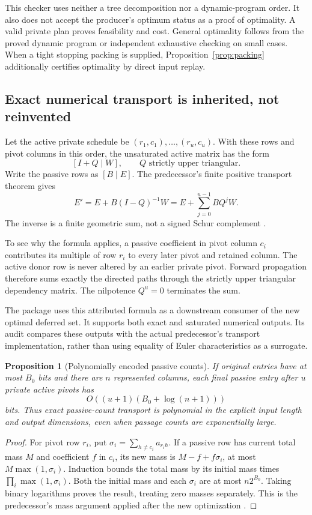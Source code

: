 \documentclass[11pt]{article}
\newtheorem{proposition}[theorem]{Proposition}
\theoremstyle{definition}\newtheorem{definition}[theorem]{Definition}
\theoremstyle{remark}\newtheorem{remark}[theorem]{Remark}
\begin{document}
This checker uses neither a tree decomposition nor a dynamic-program order. It also does not accept the producer's optimum status as a proof of optimality. A valid private plan proves feasibility and cost. General optimality follows from the proved dynamic program or independent exhaustive checking on small cases. When a tight stopping packing is supplied, Proposition~\ref{prop:packing} additionally certifies optimality by direct input replay.

\subsection{Exact numerical transport is inherited, not reinvented}
Let the active private schedule be $(r_1,c_1),\ldots,(r_u,c_u)$. With these rows and pivot columns in this order, the unsaturated active matrix has the form
\[
 [I+Q\mid W],\qquad Q\text{ strictly upper triangular}.
\]
Write the passive rows as $[B\mid E]$. The predecessor's finite positive transport theorem gives
\begin{equation}
 E'=E+B(I-Q)^{-1}W
   =E+\sum_{j=0}^{u-1}BQ^jW.
 \label{eq:passive}
\end{equation}
The inverse is a finite geometric sum, not a signed Schur complement \cite{positive}.

To see why the formula applies, a passive coefficient in pivot column $c_i$ contributes its multiple of row $r_i$ to every later pivot and retained column. The active donor row is never altered by an earlier private pivot. Forward propagation therefore sums exactly the directed paths through the strictly upper triangular dependency matrix. The nilpotence $Q^u=0$ terminates the sum.

The package uses this attributed formula as a downstream consumer of the new optimal deferred set. It supports both exact and saturated numerical outputs. Its audit compares these outputs with the actual predecessor's transport implementation, rather than using equality of Euler characteristics as a surrogate.

\begin{proposition}[Polynomially encoded passive counts]
If original entries have at most $B_0$ bits and there are $n$ represented columns, each final passive entry after $u$ private active pivots has
\[
 O((u+1)(B_0+\log(n+1)))
\]
bits. Thus exact passive-count transport is polynomial in the explicit input length and output dimensions, even when passage counts are exponentially large.
\end{proposition}
\begin{proof}
For pivot row $r_i$, put $\sigma_i=\sum_{h\ne c_i}a_{r_i h}$. If a passive row has current total mass $M$ and coefficient $f$ in $c_i$, its new mass is $M-f+f\sigma_i$, at most $M\max(1,\sigma_i)$. Induction bounds the total mass by its initial mass times $\prod_i\max(1,\sigma_i)$. Both the initial mass and each $\sigma_i$ are at most $n2^{B_0}$. Taking binary logarithms proves the result, treating zero masses separately. This is the predecessor's mass argument applied after the new optimization \cite{positive}.
\end{proof}
\end{document}
